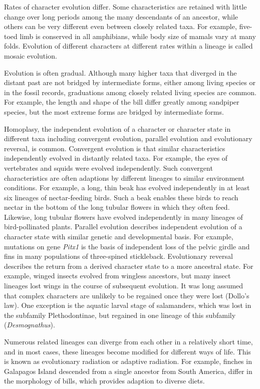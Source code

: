 \documentclass[11pt]{article}
\begin{document}
\begin{sloppypar}
\par

Rates of character evolution differ. 
Some characteristics are retained with little change over long periods among the many descendants of an ancestor, while others can be very different even between closely related taxa. 
For example, five-toed limb is conserved in all amphibians, while body size of mamals vary at many folds. 
Evolution of different characters at different rates within a lineage is called mosaic evolution. 

\par

Evolution is often gradual. 
Although many higher taxa that diverged in the distant past are not bridged by intermediate forms, either among living species or in the fossil records, graduations among closely related living species are common. 
For example, the length and shape of the bill differ greatly among sandpiper species, but the most extreme forms are bridged by intermediate forms. 

\par

Homoplasy, the independent evolution of a character or character state in different taxa including convergent evolution, parallel evolution and evolutionary reversal, is common. 
Convergent evolution is that similar characteristics independently evolved in distantly related taxa. 
For example, the eyes of vertebrates and squids were evolved independently. 
Such convergent characteristics are often adaptions by different lineages to similar environment conditions. 
For example, a long, thin beak has evolved independently in at least six lineages of nectar-feeding birds. 
Such a beak enables these birds to reach nectar in the bottom of the long tubular flowers in which they often feed. 
Likewise, long tubular flowers have evolved independently in many lineages of bird-pollinated plants. 
Parallel evolution describes independent evolution of a character state with similar genetic and developmental basis. 
For example, mutations on gene \textit{Pitx1} is the basis of independent loss of the pelvic girdle and fins in many populations of three-spined stickleback. 
Evolutionary reversal describes the return from a derived character state to a more ancestral state. 
For example, winged insects evolved from wingless ancestors, but many insect lineages lost wings in the course of subsequent evolution. 
It was long assumed that complex characters are unlikely to be regained once they were lost (Dollo's law). 
One exception is the aquatic larval stage of salamanders, which was lost in the subfamily Plethodontinae, but regained in one lineage of this subfamily (\textit{Desmognathus}). 

\par

Numerous related lineages can diverge from each other in a relatively short time, and in most cases, these lineages become modified for different ways of life. 
This is known as evolutionary radiation or adaptive radiation. 
For example, finches in Galapagos Island descended from a single ancestor from South America, differ in the morphology of bills, which provides adaption to diverse diets.

\end{sloppypar}
\end{document}
